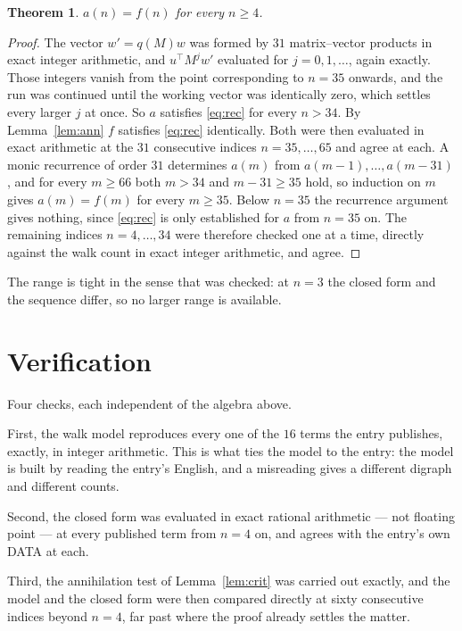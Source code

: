 \documentclass[11pt,a4paper]{article}
\theoremstyle{plain}
\newtheorem{theorem}{Theorem}
\theoremstyle{definition}
\begin{document}
\begin{theorem}
$a(n)=f(n)$ for every $n\ge4$.
\end{theorem}

\begin{proof}
The vector $w'=q(M)w$ was formed by $31$ matrix--vector products in exact integer
arithmetic, and $u^{\!\top}M^{j}w'$ evaluated for $j=0,1,\dots$, again exactly. Those integers
vanish from the point corresponding to $n=35$ onwards, and the run was continued until the
working vector was identically zero, which settles every larger $j$ at once. So $a$ satisfies
\eqref{eq:rec} for every $n>34$. By Lemma~\ref{lem:ann} $f$ satisfies \eqref{eq:rec}
identically. Both were then evaluated in exact arithmetic at the $31$ consecutive indices
$n=35,\dots,65$ and agree at each. A monic recurrence of order $31$
determines $a(m)$ from $a(m-1),\dots,a(m-31)$, and for every $m\ge66$ both
$m>34$ and $m-31\ge35$ hold, so induction on $m$ gives $a(m)=f(m)$ for every
$m\ge35$.
Below $n=35$ the recurrence argument gives nothing, since \eqref{eq:rec} is only
established for $a$ from $n=35$ on. The remaining indices $n=4,\dots,34$ were
therefore checked one at a time, directly against the walk count in exact integer arithmetic,
and agree.
\end{proof}

The range is tight in the sense that was checked: at $n=3$ the closed form and the sequence differ, so no larger range is available.

\section{Verification}

Four checks, each independent of the algebra above.

First, the walk model reproduces every one of the $16$ terms the entry publishes,
exactly, in integer arithmetic. This is what ties the model to the entry: the model is built
by reading the entry's English, and a misreading gives a different digraph and different
counts.

Second, the closed form was evaluated in exact rational arithmetic --- not floating point ---
at every published term from $n=4$ on, and agrees with the entry's own DATA at each.

Third, the annihilation test of Lemma~\ref{lem:crit} was carried out exactly, and the model
and the closed form were then compared directly at sixty consecutive indices beyond
$n=4$, far past where the proof already settles the matter.
\end{document}
